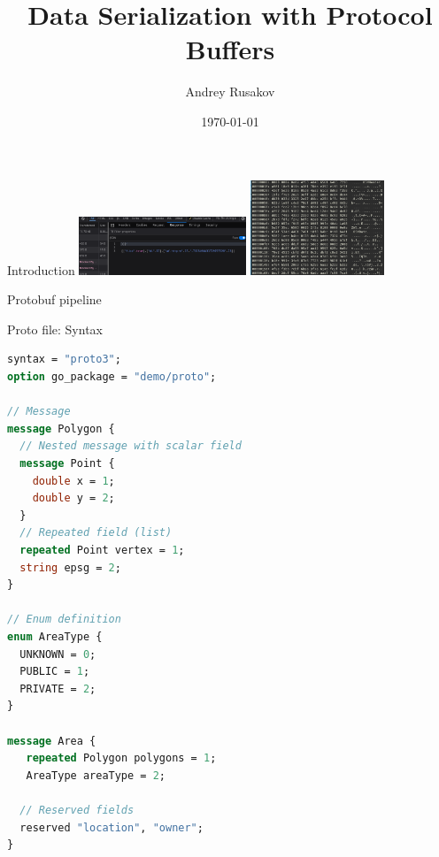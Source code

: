 \documentclass{beamer}
\title{Data Serialization with Protocol Buffers}
\author{Andrey Rusakov}
\date{\today}
\begin{document}
\begin{frame}
\titlepage
\end{frame}

\begin{frame}{Introduction}
\centering
\includegraphics[width=5cm]{gmail-proto}
\includegraphics[angle=45,width=4cm]{planet-header}
\end{frame}

\begin{frame}[fragile]{Protobuf pipeline}
  \begin{center}
  \end{center}
\end{frame}

\begin{frame}[fragile]{Proto file: Syntax}
\begin{lstlisting}[language=protobuf, caption={Typical protocol buffer file}]
syntax = "proto3";
option go_package = "demo/proto";

// Message
message Polygon {
  // Nested message with scalar field
  message Point {
    double x = 1;
    double y = 2;
  }
  // Repeated field (list)
  repeated Point vertex = 1;
  string epsg = 2;
}

// Enum definition
enum AreaType {
  UNKNOWN = 0;
  PUBLIC = 1;
  PRIVATE = 2;
}

message Area {
   repeated Polygon polygons = 1;
   AreaType areaType = 2;

  // Reserved fields
  reserved "location", "owner";
}
\end{lstlisting}
\end{frame}
\end{document}
